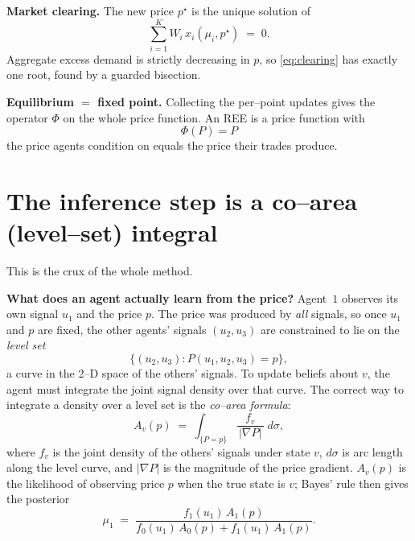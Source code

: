 \documentclass[11pt]{article}
\newcommand{\grad}{\nabla}
\begin{document}
\textbf{Market clearing.} The new price $p^\star$ is the unique solution of
\begin{equation}
  \sum_{i=1}^{K} W_i\,x_i(\mu_i,p^\star) \;=\; 0 .
  \label{eq:clearing}
\end{equation}
Aggregate excess demand is strictly decreasing in $p$, so \eqref{eq:clearing}
has exactly one root, found by a guarded bisection.

\textbf{Equilibrium $=$ fixed point.} Collecting the per--point updates gives
the operator $\Phi$ on the whole price function. An REE is a price function
with
\begin{equation}
  \boxed{\;\Phi(P) = P\;}
\end{equation}
the price agents condition on equals the price their trades produce.

\section{The inference step is a co--area (level--set) integral}
\label{sec:coarea}

This is the crux of the whole method.

\textbf{What does an agent actually learn from the price?} Agent~$1$
observes its own signal $u_1$ and the price $p$. The price was produced by
\emph{all} signals, so once $u_1$ and $p$ are fixed, the other agents'
signals $(u_2,u_3)$ are constrained to lie on the \emph{level set}
\begin{equation}
  \{(u_2,u_3): P(u_1,u_2,u_3)=p\},
\end{equation}
a curve in the 2--D space of the others' signals. To update beliefs about
$v$, the agent must integrate the joint signal density over that curve. The
correct way to integrate a density over a level set is the \emph{co--area
formula}:
\begin{equation}
  A_v(p) \;=\; \int_{\{P=p\}} \frac{f_v}{\,|\grad P|\,}\;d\sigma,
  \label{eq:coarea}
\end{equation}
where $f_v$ is the joint density of the others' signals under state $v$,
$d\sigma$ is arc length along the level curve, and $|\grad P|$ is the
magnitude of the price gradient. $A_v(p)$ is the likelihood of observing
price $p$ when the true state is $v$; Bayes' rule then gives the posterior
\begin{equation}
  \mu_1 \;=\; \frac{f_1(u_1)\,A_1(p)}
                   {f_0(u_1)\,A_0(p)+f_1(u_1)\,A_1(p)} .
  \label{eq:bayes}
\end{equation}
\end{document}
